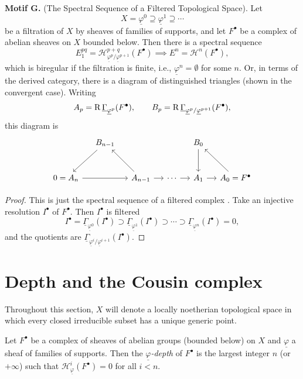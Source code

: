 \medskip{}\label{motif:4.1.G}\noindent\textbf{Motif G.} (The Spectral Sequence of a Filtered Topological Space). Let
\[
X = \underline{\varphi}^0 \supseteq \underline{\varphi}^1 \supseteq \cdots
\]
be a filtration of $X$ by sheaves of families of supports, and let $F^\bullet$ be a complex of abelian sheaves on $X$ bounded below. Then there is a spectral sequence
\[
E_1^{pq}=\mathcal{H}^{p+q}_{\underline{\varphi}^p/\underline{\varphi}^{p+1}}(F^\bullet)\implies E^n=\mathcal{H}^n(F^\bullet),
\]
which is biregular \cite[\nopp $0_{\mathrm{III}}$, \S11]{EGA} if the filtration is finite, i.e., $\underline{\varphi}^n=\emptyset$ for some $n$. Or, in terms of the derived category, there is a diagram of distinguished triangles (shown in the convergent case).
Writing
\[
A_p=\operatorname{R}\underline{\Gamma}_{\underline{\varphi}^p}(F^\bullet),
\qquad B_p=\operatorname{R}\underline{\Gamma}_{\underline{\varphi}^p/\underline{\varphi}^{p+1}}(F^\bullet),
\]
this diagram is
\[
\begin{tikzcd}[row sep=large, column sep=small]
 & B_{n-1} \arrow[dl] & & & B_0 \arrow[d] & \\
0=A_n \arrow[rr] & & A_{n-1} \arrow[ul] \arrow[r]
 & \cdots \arrow[r] & A_1 \arrow[r] & A_0=F^\bullet \arrow[ul]
\end{tikzcd}
\]
\begin{proof}
This is just the spectral sequence of a filtered complex \cite[\nopp Ch.~XV]{M}. Take an injective resolution $I^\bullet$ of $F^\bullet$. Then $I^\bullet$ is filtered
\[
I^\bullet = \underline{\Gamma}_{\underline{\varphi}^0}(I^\bullet)\supset \underline{\Gamma}_{\underline{\varphi}^1}(I^\bullet)\supset \cdots \supset \underline{\Gamma}_{\underline{\varphi}^n}(I^\bullet)=0,
\]
and the quotients are $\underline{\Gamma}_{\underline{\varphi}^i/\underline{\varphi}^{i+1}}(I^\bullet)$.
\end{proof}

\section{Depth and the Cousin complex}\label{sec:4.2}

Throughout this section, $X$ will denote a locally noetherian topological space in which every closed irreducible subset has a unique generic point.

\begin{definition*}
Let $F^\bullet$ be a complex of sheaves of abelian groups (bounded below) on $X$ and $\underline{\varphi}$ a sheaf of families of supports. Then the \emph{$\underline{\varphi}$-depth} of $F^\bullet$ is the largest integer $n$ (or $+\infty$) such that $\mathcal{H}^{i}_{\underline{\varphi}}(F^\bullet)=0$ for all $i<n$.
\end{definition*}

